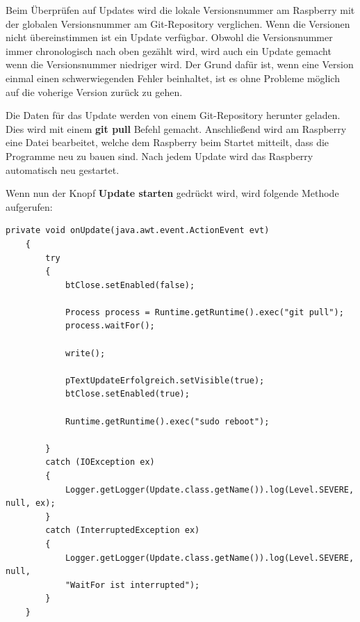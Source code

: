 \vspace{10pt}

Beim Überprüfen auf Updates wird die lokale Versionsnummer am Raspberry mit der globalen Versionsnummer am Git-Repository verglichen. Wenn die Versionen nicht übereinstimmen ist ein Update verfügbar. Obwohl die Versionsnummer immer chronologisch nach oben gezählt wird, wird auch ein Update gemacht wenn die Versionsnummer niedriger wird. Der Grund dafür ist, wenn eine Version einmal einen schwerwiegenden Fehler beinhaltet, ist es ohne Probleme möglich auf die voherige Version zurück zu gehen. 

\vspace{10pt}

Die Daten für das Update werden von einem Git-Repository herunter geladen. Dies wird mit einem \textbf{git pull} Befehl gemacht. Anschließend wird am Raspberry eine Datei bearbeitet, welche dem Raspberry beim Startet mitteilt, dass die Programme neu zu bauen sind. Nach jedem Update wird das Raspberry automatisch neu gestartet.

\vspace{10pt}

Wenn nun der Knopf \textbf{Update starten} gedrückt wird, wird folgende Methode aufgerufen:
\begin{lstlisting}[style=JavaStyle, caption= Update]
    private void onUpdate(java.awt.event.ActionEvent evt)                          
    {                              
        try
        {
            btClose.setEnabled(false);
            
            Process process = Runtime.getRuntime().exec("git pull");
            process.waitFor();

            write();

            pTextUpdateErfolgreich.setVisible(true);
            btClose.setEnabled(true);

            Runtime.getRuntime().exec("sudo reboot");

        }
        catch (IOException ex)
        {
            Logger.getLogger(Update.class.getName()).log(Level.SEVERE, null, ex);
        }
        catch (InterruptedException ex)
        {
            Logger.getLogger(Update.class.getName()).log(Level.SEVERE, null, 
            "WaitFor ist interrupted");
        }        
    }
\end{lstlisting}

